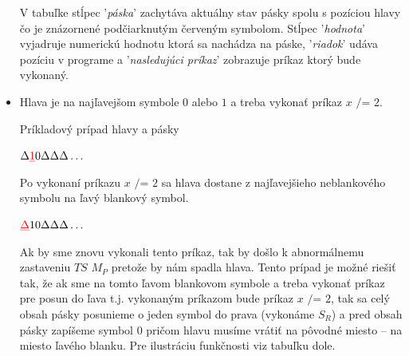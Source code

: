 \documentclass[11pt,a4paper]{article}
\newcommand{\red}[1]{\textcolor{red}{#1}}
\begin{document}
\begin{itemize}
\begin{flushright}
\begin{minipage}{0.90\textwidth}
            V tabuľke stĺpec '\textit{páska}' zachytáva aktuálny stav pásky spolu s pozíciou hlavy čo je znázornené podčiarknutým červeným symbolom. Stĺpec '\textit{hodnota}' vyjadruje numerickú hodnotu ktorá sa nachádza na páske, '\textit{riadok}' udáva pozíciu v programe a '\textit{nasledujúci príkaz}' zobrazuje príkaz ktorý bude vykonaný.
        \end{minipage}
        \end{flushright}
    \item Hlava je na najľavejšom symbole $0$ alebo $1$ a treba vykonať príkaz $x \texttt{ /= } 2$.\\[-1.5em]
        \begin{flushright}
        \begin{minipage}{0.90\textwidth}
            Príkladový prípad hlavy a pásky

            \begin{center}
                $\Delta \red{\underbar{1}} 0 \Delta \Delta \Delta \dots$
            \end{center}

            Po vykonaní príkazu $x \texttt{ /= } 2$ sa hlava dostane z najľavejšieho neblankového symbolu na ľavý blankový symbol.

            \begin{center}
                $\red{\underbar{$\Delta$}} 1 0 \Delta \Delta \Delta \dots$
            \end{center}

            Ak by sme znovu vykonali tento príkaz, tak by došlo k abnormálnemu zastaveniu $TS$ $M_P$ pretože by nám spadla hlava. Tento prípad je možné riešiť tak, že ak sme na tomto ľavom blankovom symbole a treba vykonať príkaz pre posun do ľava t.j. vykonaným príkazom bude príkaz $x \texttt{ /= } 2$, tak sa celý obsah pásky posunieme o jeden symbol do prava (vykonáme $S_R$) a pred obsah pásky zapíšeme symbol $0$ pričom hlavu musíme vrátiť na pôvodné miesto -- na miesto ľavého blanku. Pre ilustráciu funkčnosti viz tabuľku dole.


\end{minipage}
\end{flushright}
\end{itemize}
\end{document}
